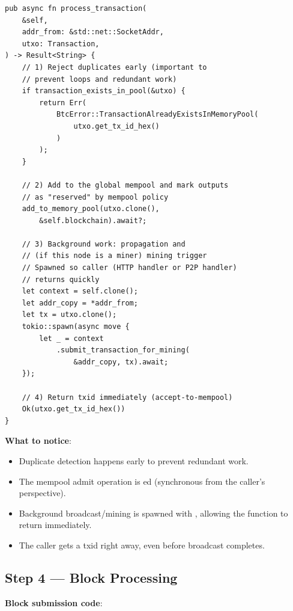 \begin{listing}[H]
\caption{Mempool acceptance entry point ()}
\label{lst:9-8-3}
\begin{verbatim}
pub async fn process_transaction(
    &self,
    addr_from: &std::net::SocketAddr,
    utxo: Transaction,
) -> Result<String> {
    // 1) Reject duplicates early (important to
    // prevent loops and redundant work)
    if transaction_exists_in_pool(&utxo) {
        return Err(
            BtcError::TransactionAlreadyExistsInMemoryPool(
                utxo.get_tx_id_hex()
            )
        );
    }

    // 2) Add to the global mempool and mark outputs
    // as "reserved" by mempool policy
    add_to_memory_pool(utxo.clone(),
        &self.blockchain).await?;

    // 3) Background work: propagation and
    // (if this node is a miner) mining trigger
    // Spawned so caller (HTTP handler or P2P handler)
    // returns quickly
    let context = self.clone();
    let addr_copy = *addr_from;
    let tx = utxo.clone();
    tokio::spawn(async move {
        let _ = context
            .submit_transaction_for_mining(
                &addr_copy, tx).await;
    });

    // 4) Return txid immediately (accept-to-mempool)
    Ok(utxo.get_tx_id_hex())
}
\end{verbatim}
\end{listing}

\textbf{What to notice}:
\begin{itemize}
  \item Duplicate detection happens early to prevent redundant work.
  \item The mempool admit operation is ed (synchronous from the caller's perspective).
  \item Background broadcast/mining is spawned with , allowing the function to return immediately.
  \item The caller gets a txid right away, even before broadcast completes.
\end{itemize}

\subsection{Step 4 --- Block Processing}
\label{sec:ch09-8-step4}

\textbf{Block submission code}: 


